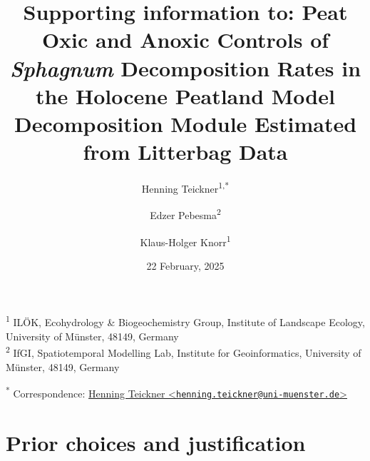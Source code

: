 \documentclass[
  12pt,
]{article}
\title{Supporting information to: Peat Oxic and Anoxic Controls of \emph{Sphagnum} Decomposition Rates in the Holocene Peatland Model Decomposition Module Estimated from Litterbag Data}
\author{Henning Teickner\textsuperscript{1,*} \and Edzer Pebesma\textsuperscript{2} \and Klaus-Holger Knorr\textsuperscript{1}}
\date{22 February, 2025}
\begin{document}
\maketitle

{
\setcounter{tocdepth}{2}
\tableofcontents
}
\textsuperscript{1} ILÖK, Ecohydrology \& Biogeochemistry Group, Institute of Landscape Ecology, University of Münster, 48149, Germany\\
\textsuperscript{2} IfGI, Spatiotemporal Modelling Lab, Institute for Geoinformatics, University of Münster, 48149, Germany

\textsuperscript{*} Correspondence: \href{mailto:henning.teickner@uni-muenster.de}{Henning Teickner \textless{}\href{mailto:henning.teickner@uni-muenster.de}{\nolinkurl{henning.teickner@uni-muenster.de}}\textgreater{}}

\renewcommand{\thefigure}{S\arabic{figure}} 
\renewcommand{\thetable}{S\arabic{table}}
\renewcommand{\thesection}{S\arabic{section}}
\renewcommand{\theequation}{S\arabic{equation}}

\hypertarget{sup-2}{%
\section{Prior choices and justification}\label{sup-2}}
\end{document}
